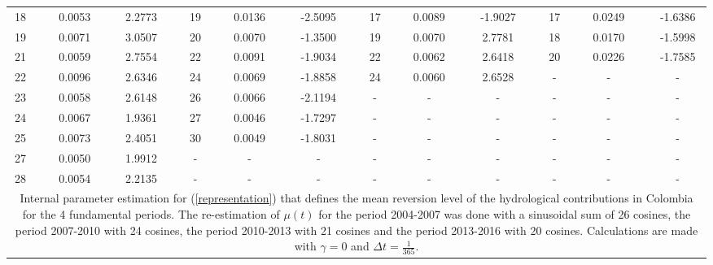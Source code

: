 \documentclass[12pt,halfline,a4paper]{ouparticle}
\begin{document}
\begin{table}
{\begin{tabular}{ccccccccccccccccccccccc}
			18    &       & 0.0053 &       & 2.2773 &       & 19    &       & 0.0136 &       & -2.5095 &       & 17    &       & 0.0089 &       & -1.9027 &       & 17    &       & 0.0249 &       & -1.6386 \\
			19    &       & 0.0071 &       & 3.0507 &       & 20    &       & 0.0070 &       & -1.3500 &       & 19    &       & 0.0070 &       & 2.7781 &       & 18    &       & 0.0170 &       & -1.5998 \\
			21    &       & 0.0059 &       & 2.7554 &       & 22    &       & 0.0091 &       & -1.9034 &       & 22    &       & 0.0062 &       & 2.6418 &       & 20    &       & 0.0226 &       & -1.7585 \\
			22    &       & 0.0096 &       & 2.6346 &       & 24    &       & 0.0069 &       & -1.8858 &       & 24    &       & 0.0060 &       & 2.6528 &       & -     &       & -     &       & - \\
			23    &       & 0.0058 &       & 2.6148 &       & 26    &       & 0.0066 &       & -2.1194 &       & -     &       & -     &       & -     &       & -     &       & -     &       & - \\
			24    &       & 0.0067 &       & 1.9361 &       & 27    &       & 0.0046 &       & -1.7297 &       & -     &       & -     &       & -     &       & -     &       & -     &       & - \\
			25    &       & 0.0073 &       & 2.4051 &       & 30    &       & 0.0049 &       & -1.8031 &       & -     &       & -     &       & -     &       & -     &       & -     &       & - \\
			27    &       & 0.0050 &       & 1.9912 &       & -     &       & -     &       & -     &       & -     &       & -     &       & -     &       & -     &       & -     &       & - \\
			28    &       & 0.0054 &       & 2.2135 &       & -     &       & -     &       & -     &       & -     &       & -     &       & -     &       & -     &       & -     &       & - \\
			\bottomrule
			\bottomrule
			\multicolumn{23}{p{20.5cm}}{\footnotesize{Internal parameter estimation for (\ref{representation}) that defines the mean reversion level of the hydrological contributions in Colombia for the 4 fundamental periods. The re-estimation of $\mu(t)$ for the period 2004-2007 was done with a sinusoidal sum of 26 cosines, the period 2007-2010 with 24 cosines, the period 2010-2013 with 21 cosines and the period 2013-2016 with 20 cosines. Calculations are made with $\gamma=0$ and $\Delta t=\frac{1}{365}$.}}
	\end{tabular}}
	\label{tab:paramint}
\end{table}
\end{document}
